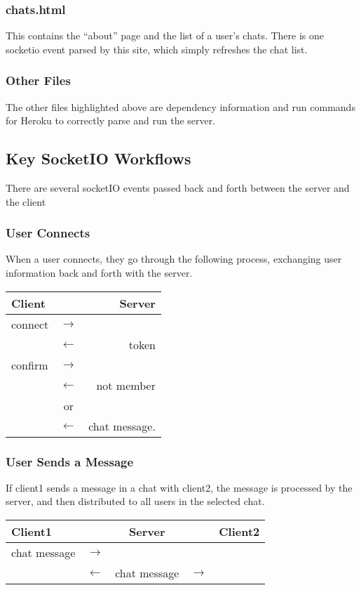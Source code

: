 \documentclass[12pt]{article}
\begin{document}
\subsubsection*{chats.html}
This contains the ``about'' page and the list of a user's chats.
There is one socketio event parsed by this site, which simply
refreshes the chat list.

\subsubsection*{Other Files}
The other files highlighted above are dependency information and run
commands for Heroku to correctly parse and run the server.

\subsection*{Key SocketIO Workflows}

There are several socketIO events passed back and forth between the
server and the client 

\subsubsection*{User Connects}
When a user connects, they go through the following process,
exchanging user information back and forth with the server.
\begin{center}
  \begin{tabular}{lcr}
    Client & & Server\\
    \hline
    connect & $\rightarrow$ & \\
           & $\leftarrow$ & token\\
    confirm & $\rightarrow$ \\
           &$\leftarrow$& not member\\
           & or &\\
           &$\leftarrow$& chat message.
  \end{tabular}
\end{center}

\subsubsection*{User Sends a Message}
If client1 sends a message in a chat with client2, the message is
processed by the server, and then distributed to all users in the
selected chat.
\begin{center}
  \begin{tabular}{lcccr}
    Client1 && Server && Client2\\
    \hline
    chat message &$\rightarrow$&&&\\
    &$\leftarrow$& chat message & $\rightarrow$&
  \end{tabular}
\end{center}
\end{document}
